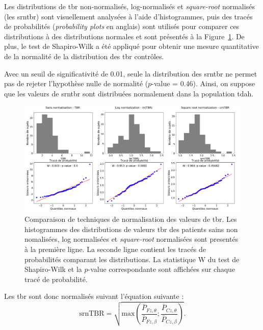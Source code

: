Les distributions de \gls{tbr} non-normalisés, log-normalisés et \textit{square-root} normalisés (les \gls{srntbr}) sont visuellement analysées à l'aide 
d'histogrammes, puis des tracés de probabilités (\textit{probability plots} en anglais) sont utilisés pour comparer ces distributions à des distributions normales 
et sont présentés à la Figure~\ref{Figure:tbr_normalization}. De plus, le test de Shapiro-Wilk \citep{Shapiro1965} a été appliqué pour obtenir une mesure quantitative 
de la normalité de la distribution des \gls{tbr} contrôles. 

Avec un seuil de significativité de 0.01, seule la distribution des \gls{srntbr} ne permet pas de rejeter l'hypothèse
nulle de normalité ($p$-value = 0.46). Ainsi, on suppose que les valeurs de \gls{srntbr} sont distribuées normalement dans la population \gls{tdah}. 

\begin{figure}[h!]
  \centering
	\includegraphics[width=1.0\linewidth]{figures/chapter-4/tbr-normalization} 
  \caption[Comparaison de techniques de normalisation des valeurs de \gls{tbr}.]{Comparaison de techniques de normalisation des valeurs de \gls{tbr}. 
	Les histogrammes des distributions de valeurs \gls{tbr} des patients sains non nomalisées,
	log normalisées et \textit{square-root} normalisées sont presentés à la première ligne. La seconde ligne contient les tracés de probabilités comparant les
	distributions. La statistique W du test de Shapiro-Wilk et la $p$-value correspondante sont affichées sur chaque tracé de probabilité.}
  \label{Figure:tbr_normalization}
\end{figure}

Les \gls{tbr} sont donc normalisés suivant l'équation suivante :
\begin{equation}
\label{eq:tbr_srntbr_computation}
\text{srnTBR} = \sqrt{ \text{max}\left(\frac{\bar{P}_{Fz,\theta}}{\bar{P}_{Fz,\beta} } ; \frac{\bar{P}_{Cz,\theta}}{\bar{P}_{Cz,\beta}}\right) }.
\end{equation}

